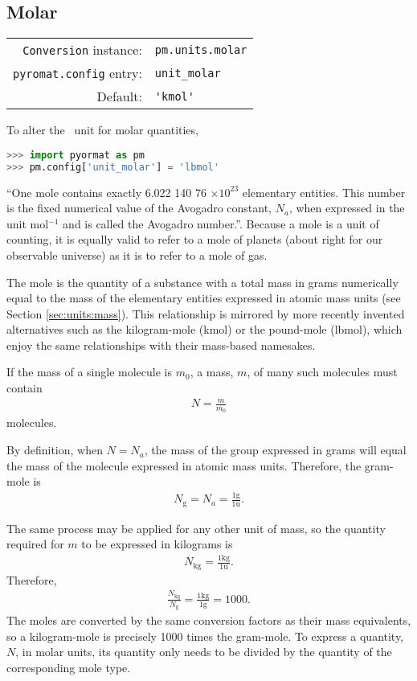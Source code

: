 %
%

\subsection{Molar}\label{sec:units:molar}

\begin{tabular}{rl}
\hline
\verb|Conversion| instance: & \verb|pm.units.molar|\\
\verb|pyromat.config| entry: & \verb|unit_molar|\\
Default: & \verb|'kmol'|\\
\hline
\end{tabular}
\vspace{1em}

To alter the \PM\ unit for molar quantities,
\begin{lstlisting}[language=Python]
>>> import pyormat as pm
>>> pm.config['unit_molar'] = 'lbmol'
\end{lstlisting}

``One mole contains exactly 6.022 140 76 $\times 10^{23}$ elementary entities. This number is the fixed numerical value of the Avogadro constant, $N_a$, when expressed in the unit mol$^{-1}$ and is called the Avogadro number.''\cite{bipm}.  Because a mole is a unit of counting, it is equally valid to refer to a mole of planets (about right for our observable universe) as it is to refer to a mole of gas.

The mole is the quantity of a substance with a total mass in grams numerically equal to the mass of the elementary entities expressed in atomic mass units (see Section \ref{sec:units:mass}).  This relationship is mirrored by more recently invented alternatives such as the kilogram-mole (kmol) or the pound-mole (lbmol), which enjoy the same relationships with their mass-based namesakes.

If the mass of a single molecule is $m_0$, a mass, $m$, of many such molecules must contain
\begin{align}
N = \frac{m}{m_0}
\end{align}
molecules.

By definition, when $N = N_a$, the mass of the group expressed in grams will equal the mass of the molecule expressed in atomic mass units.  Therefore, the gram-mole is
\begin{align}
N_\mathrm{g} = N_a = \frac{1\mathrm{g}}{1\mathrm{u}}.
\end{align}

The same process may be applied for any other unit of mass, so the quantity required for $m$ to be expressed in kilograms is
\begin{align}
N_\mathrm{kg} = \frac{1\mathrm{kg}}{1\mathrm{u}}.
\end{align}
Therefore,
\begin{align}
\frac{N_\mathrm{kg}}{N_\mathrm{g}} = \frac{1 \mathrm{kg}}{1 \mathrm{g}} = 1000.
\end{align}
The moles are converted by the same conversion factors as their mass equivalents, so a kilogram-mole is precisely 1000 times the gram-mole.  To express a quantity, $N$, in molar units, its quantity only needs to be divided by the quantity of the corresponding mole type.

